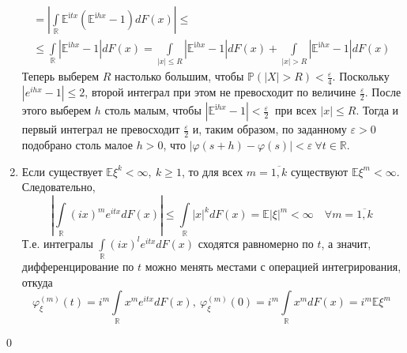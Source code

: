 \documentclass[oneside,final,14pt]{extreport}
\renewenvironment{proof}{{\bfseries Доказательство.}}{\qed}
\theoremstyle{plain}
\theoremstyle{definition}
\theoremstyle{named}
\begin{document}
\begin{proof}
\begin{enumerate}
\begin{multline*}
            = \left|\int\limits_{\mathbb{R}} \mathbb{E}^{\mathrm{i} t x}\left(\mathbb{E}^{\mathrm{i} h x}-1\right) d F(x)\right| \leqslant \\
            \leqslant \int\limits_{\mathbb{R}} \left|\mathbb{E}^{\mathrm{i} h x}-1\right| d F(x)=\int\limits_{|x| \leqslant R}\left|\mathbb{E}^{\mathrm{i} h x}-1\right| d F(x)+\int\limits_{|x|>R}\left|\mathbb{E}^{\mathrm{i} h x}-1\right| d F(x)
        \end{multline*}
        Теперь выберем $R$ настолько большим, чтобы $\mathbb{P}(|X|>R) < \frac{\varepsilon}{4}$. Поскольку $\left|e^{i h x}-1\right| \leqslant 2$, второй интеграл при этом не превосходит по величине $\frac{\varepsilon}{2}$. После этого выберем $h$ столь малым, чтобы $\left|\mathbb{E}^{\mathrm{i} h x}-1\right|<\frac{\varepsilon}{2}~$ при всех $|x| \leqslant R$. Тогда и первый интеграл не превосходит $\frac{\varepsilon}{2}$ и, таким образом, по заданному $\varepsilon > 0$ подобрано столь малое $h >0$, что $|\varphi(s+h)-\varphi(s)|<\varepsilon~ \forall t \in \mathbb{R}$.
        \item Если существует $\mathbb{E}\xi^{k}<\infty,~ k \geqslant 1$, то для всех $m = \overline{1, k}$ существуют $\mathbb{E}\xi^{m}<\infty$. Следовательно,
        \begin{equation*}
            \left|\int\limits_{\mathbb{R}}(i x)^{m} e^{i t x} d F(x)\right| \leqslant \int\limits_{\mathbb{R}}|x|^{k} d F(x)=\mathbb{E}|\xi|^{m}<\infty \quad \forall m = \overline{1, k}
        \end{equation*}
        Т.е. интегралы $\int\limits_{\mathbb{R}}(i x)^{l} e^{i t x} d F(x)$ сходятся равномерно по $t$, а значит, дифференцирование по $t$ можно менять местами с операцией интегрирования, откуда
        \begin{equation*}
            \varphi_{\xi}^{(m)}(t)=i^{m} \int\limits_{\mathbb{R}} x^{m} e^{i t x} d F(x),~ \varphi_{\xi}^{(m)}(0)=i^{m} \int\limits_{\mathbb{R}} x^{m} d F(x)=i^{m} \mathbb{E}\xi^{m}
        \end{equation*}
    \end{enumerate}
\end{proof}
\end{document}
